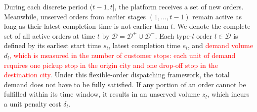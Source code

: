 \documentclass[10pt, reqno]{amsart}
\begin{document}
During each discrete period $(t-1, t]$, the platform receives a set of new orders. Meanwhile, unserved orders from earlier stages $(1, \dots, t-1)$ remain active as long as their latest completion time is not earlier than $t$. We denote the complete set of all active orders at time $t$ by $\mathcal{D} = \mathcal{D}^+ \cup \mathcal{D}^-$. Each type-$l$ order $l \in \mathcal{D}$ is defined by its earliest start time $s_l$, latest completion time $e_l$, and \textcolor{red}{demand volume} $d_l$\textcolor{red}{, which is measured in the number of customer stops: each unit of demand requires one pickup stop in the origin city and one drop-off stop in the destination city}. Under this flexible-order dispatching framework, the total demand does not have to be fully satisfied. If any portion of an order cannot be fulfilled within its time window, it results in an unserved volume $z_l$, which incurs a unit penalty cost $\delta_l$.
\end{document}
